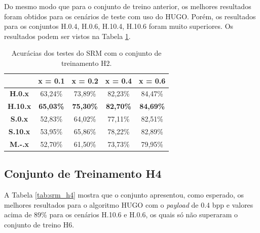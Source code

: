 Do mesmo modo que para o conjunto de treino anterior, os melhores resultados foram obtidos para os cenários de teste com uso do HUGO. Porém, os resultados para os conjuntos H.0.4, H.0.6, H.10.4, H.10.6 foram muito superiores. Os resultados podem ser vistos na Tabela \ref{tab:srm_h2}.

\begin{table}[!htb]
\centering
\begin{tabular}{c|c|c|c|c|}
\cline{2-5}
\textbf{}                             & \textbf{x = 0.1} & \textbf{x = 0.2} & \textbf{x = 0.4} & \textbf{x = 0.6} \\ \hline
\multicolumn{1}{|c|}{\textbf{H.0.x}}  & 63,24\%          & 73,89\%    & 82,23\%          & 84,47\%          \\ \hline
\multicolumn{1}{|c|}{\textbf{H.10.x}} & \textbf{65,03\%} & \textbf{75,30\%} & \textbf{82,70\%} & \textbf{84,69\%} \\ \hline
\multicolumn{1}{|c|}{\textbf{S.0.x}}  & 52,83\%          & 64,02\%          & 77,11\%          & 82,51\%          \\ \hline
\multicolumn{1}{|c|}{\textbf{S.10.x}} & 53,95\%          & 65,86\%          & 78,22\%          & 82,89\%          \\ \hline
\multicolumn{1}{|c|}{\textbf{M.-.x}}  & 52,70\%          & 61,50\%          & 73,73\%          & 79,95\%          \\ \hline
\end{tabular}
\caption{Acurácias dos testes do SRM com o conjunto de treinamento H2.}
\label{tab:srm_h2}
\end{table}


\subsection{Conjunto de Treinamento H4}

A Tabela \ref{tab:srm_h4} mostra que o conjunto apresentou, como esperado, os melhores resultados para o algoritmo HUGO com o \textit{payload} de 0.4 bpp e valores acima de 89\% para os cenários H.10.6 e H.0.6, os quais só não superaram o conjunto de treino H6.

